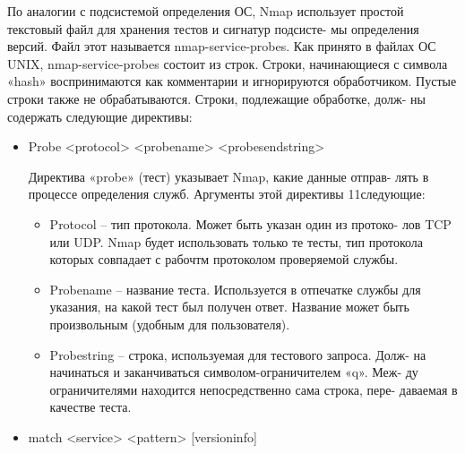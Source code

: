 \documentclass[12pt,a4paper]{article}
\begin{document}
По аналогии с подсистемой определения ОС, Nmap использует
простой текстовый файл для хранения тестов и сигнатур подсисте-
мы определения версий. Файл этот называется nmap-service-probes.
Как принято в файлах ОС UNIX, nmap-service-probes состоит из
строк. Строки, начинающиеся с символа «hash» воспринимаются
как комментарии и игнорируются обработчиком. Пустые строки
также не обрабатываются. Строки, подлежащие обработке, долж-
ны содержать следующие директивы:
\begin{itemize}
\item Probe <protocol> <probename> <probesendstring>

Директива «probe» (тест) указывает Nmap, какие данные отправ-
лять в процессе определения служб. Аргументы этой директивы
11следующие:
\begin{itemize}
\item Protocol – тип протокола. Может быть указан один из протоко-
лов TCP или UDP. Nmap будет использовать только те тесты, тип
протокола которых совпадает с рабочтм протоколом проверяемой
службы.
\item Probename – название теста. Используется в отпечатке службы для
указания, на какой тест был получен ответ. Название может быть
произвольным (удобным для пользователя).
\item Probestring – строка, используемая для тестового запроса. Долж-
на начинаться и заканчиваться символом-ограничителем «q». Меж-
ду ограничителями находится непосредственно сама строка, пере-
даваемая в качестве теста.
\end{itemize}
\item match <service> <pattern> [versioninfo]


\end{itemize}
\end{document}
